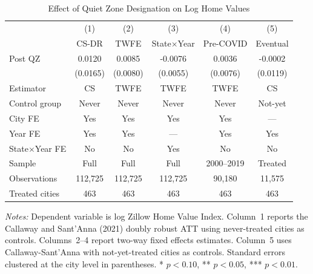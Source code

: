 \begin{table}[t]
\centering
\caption{Effect of Quiet Zone Designation on Log Home Values}
\label{tab:main}
\begin{tabular}{lccccc}
\hline\hline
 & (1) & (2) & (3) & (4) & (5) \\
 & CS-DR & TWFE & State$\times$Year & Pre-COVID & Eventual \\
\hline
Post QZ & 0.0120 & 0.0085 & -0.0076 & 0.0036 & -0.0002 \\
 & (0.0165) & (0.0080) & (0.0055) & (0.0076) & (0.0119) \\
\hline
Estimator & CS & TWFE & TWFE & TWFE & CS \\
Control group & Never & Never & Never & Never & Not-yet \\
City FE & Yes & Yes & Yes & Yes & --- \\
Year FE & Yes & Yes & --- & Yes & Yes \\
State$\times$Year FE & No & No & Yes & No & No \\
Sample & Full & Full & Full & 2000--2019 & Treated \\
Observations & 112,725 & 112,725 & 112,725 & 90,180 & 11,575 \\
Treated cities & 463 & 463 & 463 & 463 & 463 \\
\hline\hline
\end{tabular}
\par\vspace{0.3em}
{\footnotesize
\textit{Notes:} Dependent variable is log Zillow Home Value Index. Column~1 reports the Callaway and Sant'Anna (2021) doubly robust ATT using never-treated cities as controls. Columns~2--4 report two-way fixed effects estimates. Column~5 uses Callaway-Sant'Anna with not-yet-treated cities as controls. Standard errors clustered at the city level in parentheses. * $p<0.10$, ** $p<0.05$, *** $p<0.01$.
}
\end{table}

